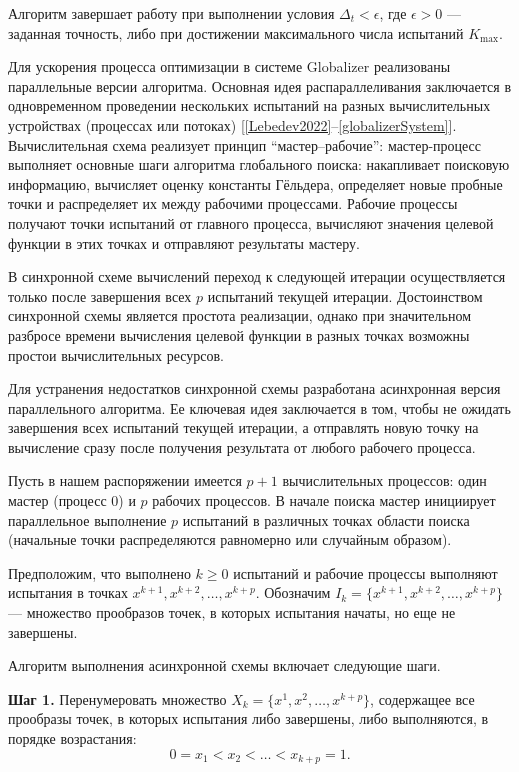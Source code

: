 \documentclass[10pt,a4paper]{book}
\begin{document}
Алгоритм завершает работу при выполнении условия $\Delta_t < \epsilon$, где $\epsilon > 0$ --- заданная точность, либо при достижении максимального числа испытаний $K_{\max}$.

Для ускорения процесса оптимизации в системе Globalizer реализованы параллельные версии алгоритма. Основная идея распараллеливания заключается в одновременном проведении нескольких испытаний на разных вычислительных устройствах (процессах или потоках) [\ref{Lebedev2022}--\ref{globalizerSystem}]. Вычислительная схема реализует принцип ``мастер--рабочие'': мастер-процесс выполняет основные шаги алгоритма глобального поиска: накапливает поисковую информацию, вычисляет оценку константы Гёльдера, определяет новые пробные точки и распределяет их между рабочими процессами. Рабочие процессы получают точки испытаний от главного процесса, вычисляют значения целевой функции в этих точках и отправляют результаты мастеру.

В синхронной схеме вычислений переход к следующей итерации осуществляется только после завершения всех $p$ испытаний текущей итерации. Достоинством синхронной схемы является простота реализации, однако при значительном разбросе времени вычисления целевой функции в разных точках возможны простои вычислительных ресурсов.

Для устранения недостатков синхронной схемы разработана асинхронная версия параллельного алгоритма. Ее ключевая идея заключается в том, чтобы не ожидать завершения всех испытаний текущей итерации, а отправлять новую точку на вычисление сразу после получения результата от любого рабочего процесса.

Пусть в нашем распоряжении имеется $p+1$ вычислительных процессов: один мастер (процесс 0) и $p$ рабочих процессов. В начале поиска мастер инициирует параллельное выполнение $p$ испытаний в различных точках области поиска (начальные точки распределяются равномерно или случайным образом).

Предположим, что выполнено $k \geqslant 0$ испытаний и рабочие процессы выполняют испытания в точках $x^{k+1}, x^{k+2}, \ldots, x^{k+p}$. Обозначим $I_k = \{x^{k+1}, x^{k+2}, \ldots, x^{k+p}\}$ --- множество прообразов точек, в которых испытания начаты, но еще не завершены.

Алгоритм выполнения асинхронной схемы включает следующие шаги.

\textbf{Шаг 1.} Перенумеровать множество $X_k = \{x^1, x^2, \ldots, x^{k+p}\}$, содержащее все прообразы точек, в которых испытания либо завершены, либо выполняются, в порядке возрастания:
\[
0 = x_1 < x_2 < \ldots < x_{k+p} = 1.
\]
\end{document}
